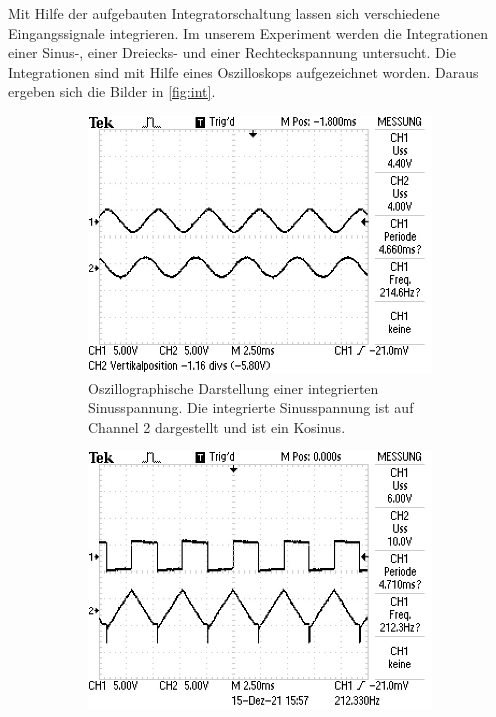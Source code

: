 Mit Hilfe der aufgebauten Integratorschaltung lassen sich verschiedene Eingangssignale 
integrieren. 
Im unserem Experiment werden die Integrationen einer Sinus-, einer Dreiecks- und einer Rechteckspannung 
untersucht.
Die Integrationen sind mit Hilfe eines Oszilloskops aufgezeichnet worden.
Daraus ergeben sich die Bilder in \autoref{fig:int}.
\begin{figure}
    \centering
    \begin{subfigure}[b]{0.45\textwidth}
        \centering
        \includegraphics[width=\textwidth]{data_of_others_cuz_ours_suck/int/int_sinus.JPG}
        \caption{Oszillographische Darstellung einer integrierten Sinusspannung.
        Die integrierte Sinusspannung ist auf Channel 2 dargestellt und ist ein Kosinus. \cite{int_picture}}
        \label{fig:int_sin}
    \end{subfigure}
    \hfill
    \begin{subfigure}[b]{0.45\textwidth}
        \centering
        \includegraphics[width=\textwidth]{data_of_others_cuz_ours_suck/int/int_recht.JPG}

\end{subfigure}
\end{figure}
